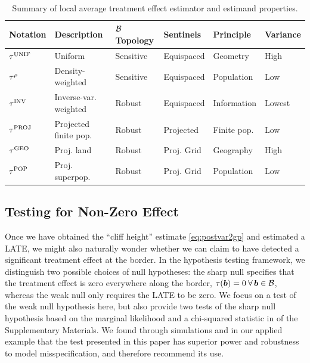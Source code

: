 \begin{table}[tbp]
    \centering
    \bgroup
    \def\arraystretch{1.1}%
    \begin{tabular}{llllll}
        \hline
        Notation   & Description           & \(\mathcal{B}\) Topology & Sentinels & Principle & Variance \\
        \hline
        \(\tau^{\mathrm{UNIF}}\) & Uniform               & Sensitive & Equispaced      & Geometry    & High     \\
        \(\tau^{\rho}\)  & Density-weighted      & Sensitive & Equispaced      & Population  & Low      \\
        \(\tau^{\mathrm{INV}}\)  & Inverse-var. weighted & Robust    & Equispaced      & Information & Lowest   \\
        \(\tau^{\mathrm{PROJ}}\) & Projected finite pop. & Robust    & Projected       & Finite pop. & Low      \\
        \(\tau^{\mathrm{GEO}}\)  & Proj. land            & Robust    & Proj. Grid  & Geography   & High     \\
        \(\tau^{\mathrm{POP}}\)  & Proj. superpop.       & Robust    & Proj. Grid  & Population  & Low \\
        \hline
    \end{tabular}
    \egroup
    \caption{
    \label{table:estimator_properties}
    Summary of local average treatment effect estimator and estimand properties.}
\end{table}

\subsection{Testing for Non-Zero Effect}
\label{sec:hypothesis_testing}
Once we have obtained the ``cliff height'' estimate \autoref{eq:postvar2gp} and estimated a LATE, we might also naturally wonder whether we can claim to have detected a significant treatment effect at the border.
In the hypothesis testing framework, we distinguish two possible choices of null hypotheses:
the sharp null specifies that the treatment effect is zero everywhere along the border,
\(\tau(\bm{b})=0\:\forall\,\bm{b} \in \mathcal{B}\), 
whereas the weak null only requires the LATE to be zero.
We focus on a test of the weak null hypothesis here, but also provide two tests of the sharp null hypothesis based on the marginal likelihood and a chi-squared statistic in  of the Supplementary Materials.
We found through simulations and in our applied example that the test presented in this paper has superior power and robustness to model misspecification, and therefore recommend its use.


